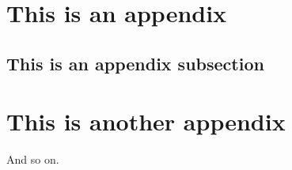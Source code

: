\documentclass[12pt]{article}
\begin{document}
  \cleardoublepage
  \phantom{text}
  \begin{appendices}
    \clearpage
    \section{This is an appendix}
    
    \subsection{This is an appendix subsection}

    \clearpage
    \section{This is another appendix}
    And so on.
  \end{appendices}

  \clearpage
  
  
\end{document}
